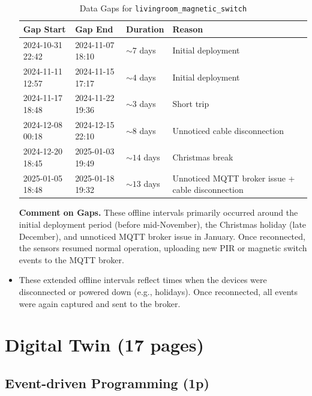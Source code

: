 \documentclass[A4,10pt]{article}
\begin{document}
\begin{itemize}
	\begin{table}[ht!]
	\centering
	\caption{Data Gaps for \texttt{livingroom\_magnetic\_switch}}
	\label{tab:magnetic_gaps}
	\begin{tabular}{llll}
	\hline
	\textbf{Gap Start}      & \textbf{Gap End}        & \textbf{Duration} & \textbf{Reason}             \\
	\hline
	2024-10-31 22:42        & 2024-11-07 18:10        & $\sim7$ days      & Initial deployment          \\
	2024-11-11 12:57        & 2024-11-15 17:17        & $\sim4$ days      & Initial deployment          \\
	2024-11-17 18:48        & 2024-11-22 19:36        & $\sim3$ days      & Short trip                  \\
	2024-12-08 00:18        & 2024-12-15 22:10        & $\sim8$ days      & Unnoticed cable disconnection         \\
	2024-12-20 18:45        & 2025-01-03 19:49        & $\sim14$ days     & Christmas break             \\
	2025-01-05 18:48        & 2025-01-18 19:32        & $\sim13$ days     & Unnoticed MQTT broker issue + cable disconnection \\
	\hline
	\end{tabular}
	\end{table}
	
	\noindent
	\textbf{Comment on Gaps.} 
	These offline intervals primarily occurred around the initial deployment period (before mid-November), the Christmas holiday (late December), and unnoticed MQTT broker issue in January. Once reconnected, the sensors resumed normal operation, uploading new PIR or magnetic switch events to the MQTT broker.
	

    \item These extended offline intervals reflect times when the devices were disconnected or powered down (e.g., holidays). Once reconnected, all events were again captured and sent to the broker.
\end{itemize}

\pagebreak
\section{Digital Twin (17 pages)}

\subsection{Event-driven Programming (1p)}
\end{document}
